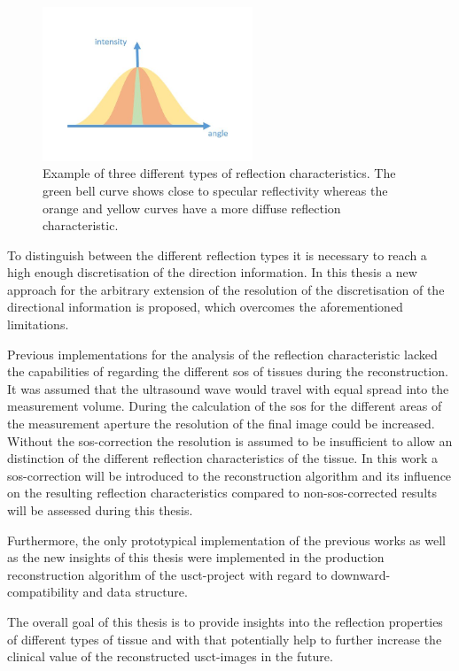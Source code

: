 \begin{figure}[H]
    \centering
    \includegraphics[width=0.56\textwidth]{Graphics/different_reflec_gauss.jpg}
    \caption{Example of three different types of reflection characteristics. The green bell curve shows close to specular reflectivity whereas the orange and yellow curves have a more diffuse reflection characteristic. }
    \label{relfec_chara_examp}
\end{figure}

To distinguish between the different reflection types it is necessary to reach a high enough discretisation of the direction information. In this thesis a new approach for the arbitrary extension of the resolution of the discretisation of the directional information is proposed, which overcomes the aforementioned limitations.

\medskip

Previous implementations for the analysis of the reflection characteristic lacked the capabilities of regarding the different \ac{sos} of tissues during the reconstruction. It was assumed that the ultrasound wave would travel with equal spread into the measurement volume. During the calculation of the \ac{sos} for the different areas of the measurement aperture the resolution of the final image could be increased. Without the \ac{sos}-correction the resolution is assumed to be insufficient to allow an distinction of the different reflection characteristics of the tissue. In this work a \ac{sos}-correction will be introduced to the reconstruction algorithm and its influence on the resulting reflection characteristics compared to non-\ac{sos}-corrected results will be assessed during this thesis.

Furthermore, the only prototypical implementation of the previous works as well as the new insights of this thesis were implemented in the production reconstruction algorithm of the \ac{usct}-project with regard to downward-compatibility and data structure.

The overall goal of this thesis is to provide insights into the reflection properties of different types of tissue and with that potentially help to further increase the clinical value of the reconstructed \ac{usct}-images in the future.


